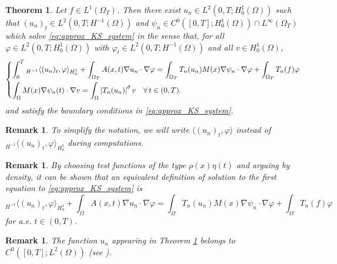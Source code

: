 \documentclass{amsart}
\numberwithin{equation}{section}
\newtheorem{remark}[example]{Remark}
\newtheorem{theo}[example]{Theorem}
\def\elle#1{L^{#1}}
\def\elleom#1{L^{#1}(\Omega)}
\def\elleomT#1{L^{#1}(\Omega_T)}
\def\H{H^1_0}
\def\Hom{H^1_0(\Omega)}
\def\io{\int_\Omega}
\def\ioT{\int_{\Omega_T}}
\newcommand{\abs}[1]{\left|#1\right|}
\begin{document}
\begin{theo}\label{theo:exists_approx_solutions}
    Let $f\in\elleomT1$. Then there exist $u_n\in \elle2(0,T;\Hom)$ such that $(u_n)_t\in \elle2(0,T;H^{-1}(\Omega))$ and $\psi_n\in C^0([0,T];\Hom)\cap\elleomT\infty$ which solve \eqref{eq:approx_KS_system} in the sense that, for all $\varphi\in\elle2(0,T;\Hom)$ with $\varphi_t\in\elle2(0,T;H^{-1}(\Omega))$ and all $v\in\Hom$,
    \begin{equation}
        \begin{dcases}
                \int_0^T {}_{H^{-1}}\langle (u_n)_t,\varphi\rangle_{\H}+\ioT A(x,t)\nabla u_n\cdot \nabla \varphi = \ioT T_n(u_n)M(x)\nabla \psi_n\cdot\nabla\varphi + \ioT T_n(f)\varphi\\
                \io M(x)\nabla \psi_n(t)\cdot\nabla v = \io \abs{T_n(u_n)}^\theta v\quad\forall\,t\in(0,T).
        \end{dcases}
    \end{equation}
    and satisfy the boundary conditions in \eqref{eq:approx_KS_system}.
\end{theo}
\begin{remark}
    To simplify the notation, we will write $\langle (u_n)_t,\varphi\rangle$ instead of ${}_{H^{-1}}\langle (u_n)_t,\varphi\rangle_{\H}$ during computations.
\end{remark}
\begin{remark}
    By choosing test functions of the type $\rho(x)\eta(t)$ and arguing by density, it can be shown that an equivalent definition of solution to the first equation to \eqref{eq:approx_KS_system} is
    \begin{equation}
        {}_{H^{-1}}\langle (u_n)_t,\varphi\rangle_{\H}+\io A(x,t)\nabla u_n\cdot \nabla \varphi = \io T_n(u_n)M(x)\nabla \psi_n\cdot\nabla\varphi + \io T_n(f)\varphi
    \end{equation}
    for a.e. $t\in(0,T)$.
\end{remark}

\begin{remark}
    The function $u_n$ appearing in Theorem \ref{theo:exists_approx_solutions} belongs to $C^0([0,T];\elleom2)$ (see \cite[Section 5.9.2]{EvansPDE}).
\end{remark}
\end{document}
